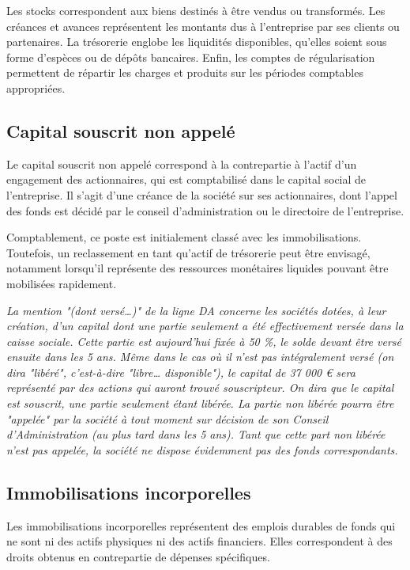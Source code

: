 \documentclass[a4paper, 12pt]{report}
\begin{document}
Les stocks correspondent aux biens destinés à être vendus ou transformés. Les créances et avances représentent les montants dus à l'entreprise par ses clients ou partenaires. La trésorerie englobe les liquidités disponibles, qu'elles soient sous forme d'espèces ou de dépôts bancaires. Enfin, les comptes de régularisation permettent de répartir les charges et produits sur les périodes comptables appropriées.

\subsection{Capital souscrit non appelé}

Le capital souscrit non appelé correspond à la contrepartie à l'actif d'un engagement des actionnaires, qui est comptabilisé dans le capital social de l'entreprise. Il s'agit d'une créance de la société sur ses actionnaires, dont l'appel des fonds est décidé par le conseil d'administration ou le directoire de l'entreprise. 

Comptablement, ce poste est initialement classé avec les immobilisations. Toutefois, un reclassement en tant qu'actif de trésorerie peut être envisagé, notamment lorsqu'il représente des ressources monétaires liquides pouvant être mobilisées rapidement.

\textit{La mention "(dont versé…)" de la ligne DA concerne les sociétés dotées, à leur
création, d’un capital dont une partie seulement a été effectivement versée dans la
caisse sociale. Cette partie est aujourd’hui fixée à 50 \%, le solde devant être versé
ensuite dans les 5 ans. Même dans le cas où il n’est pas intégralement versé (on dira
"libéré", c’est-à-dire "libre… disponible"), le capital de 37 000 € sera représenté
par des actions qui auront trouvé souscripteur. On dira que le capital est souscrit,
une partie seulement étant libérée. La partie non libérée pourra être "appelée" par
la société à tout moment sur décision de son Conseil d’Administration (au plus
tard dans les 5 ans). Tant que cette part non libérée n’est pas appelée, la société ne
dispose évidemment pas des fonds correspondants.}

\subsection{Immobilisations incorporelles}


Les immobilisations incorporelles représentent des emplois durables de fonds qui ne sont ni des actifs physiques ni des actifs financiers. Elles correspondent à des droits obtenus en contrepartie de dépenses spécifiques.
\end{document}
